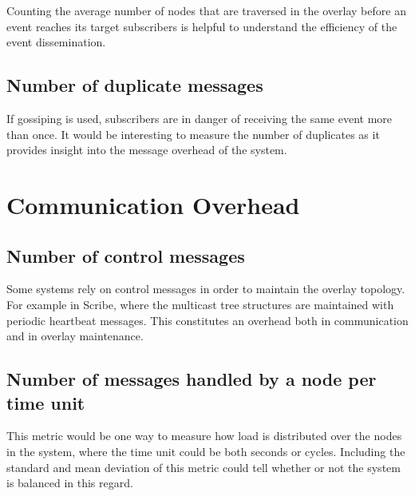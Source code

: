 Counting the average number of nodes that are traversed in the
overlay before an event reaches its target subscribers is
helpful to understand the efficiency of the event dissemination.

\subsection{Number of duplicate messages}

If gossiping is used, subscribers are in danger of receiving the
same event more than once. It would be interesting to measure
the number of duplicates as it provides insight into the message overhead of the
system.


\section{Communication Overhead}

\subsection{Number of control messages}

Some systems rely on control messages in order to maintain the overlay
topology. For example in Scribe, where the multicast tree structures are
maintained with periodic heartbeat messages. This constitutes an
overhead both in communication and in overlay maintenance.

\subsection{Number of messages handled by a node per time unit}

This metric would be one way to measure how load is distributed
over the nodes in the system, where the time unit could be both
seconds or cycles. Including the standard and mean deviation of
this metric could tell whether or not the system is balanced in
this regard.

